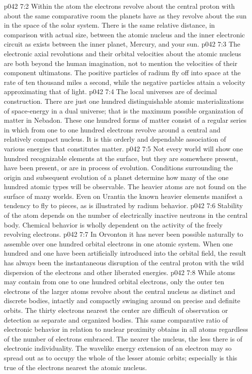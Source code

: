\pc \vs p042 7:2 Within the atom the electrons revolve about the central proton with about the same comparative room the planets have as they revolve about the sun in the space of the solar system. There is the same relative distance, in comparison with actual size, between the atomic nucleus and the inner electronic circuit as exists between the inner planet, Mercury, and your sun.
\vs p042 7:3 The electronic axial revolutions and their orbital velocities about the atomic nucleus are both beyond the human imagination, not to mention the velocities of their component ultimatons. The positive particles of radium fly off into space at the rate of ten thousand miles a second, while the negative particles attain a velocity approximating that of light.
\pc \vs p042 7:4 The local universes are of decimal construction. There are just one hundred distinguishable atomic materializations of space\hyp{}energy in a dual universe; that is the maximum possible organization of matter in Nebadon. These one hundred forms of matter consist of a regular series in which from one to one hundred electrons revolve around a central and relatively compact nucleus. It is this orderly and dependable association of various energies that constitutes matter.
\vs p042 7:5 Not every world will show one hundred recognizable elements at the surface, but they are somewhere present, have been present, or are in process of evolution. Conditions surrounding the origin and subsequent evolution of a planet determine how many of the one hundred atomic types will be observable. The heavier atoms are not found on the surface of many worlds. Even on Urantia the known heavier elements manifest a tendency to fly to pieces, as is illustrated by radium behavior.\plusone
\vs p042 7:6 Stability of the atom depends on the number of electrically inactive neutrons in the central body. Chemical behavior is wholly dependent on the activity of the freely revolving electrons.
\pc \vs p042 7:7 In Orvonton it has never been possible naturally to assemble over one hundred orbital electrons in one atomic system. When one hundred and one have been artificially introduced into the orbital field, the result has always been the instantaneous disruption of the central proton with the wild dispersion of the electrons and other liberated energies.
\pc \vs p042 7:8 While atoms may contain from one to one hundred orbital electrons, only the outer ten electrons of the larger atoms revolve about the central nucleus as distinct and discrete bodies, intactly and compactly swinging around on precise and definite orbits. The thirty electrons nearest the center are difficult of observation or detection as separate and organized bodies. This same comparative ratio of electronic behavior in relation to nuclear proximity obtains in all atoms regardless of the number of electrons embraced. The nearer the nucleus, the less there is of electronic individuality. The wavelike energy extension of an electron may so spread out as to occupy the whole of the lesser atomic orbits; especially is this true of the electrons nearest the atomic nucleus.
